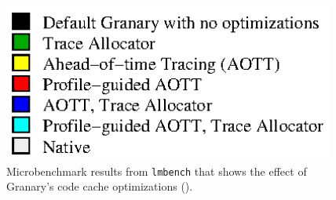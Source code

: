 \documentclass[preprint]{sigplanconf}
\begin{document}




%


\begin{figure}
\includegraphics[height=14em,clip=true,trim=0 -5em 10em -5em]{charts/lmbench_legend.eps}
\caption{\label{fig:lmbench}Microbenchmark results from \texttt{lmbench} that shows the effect of Granary's code cache optimizations ().}
\end{figure}
\end{document}
